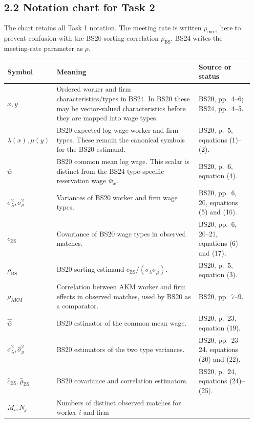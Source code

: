 \documentclass[11pt]{article}
\begin{document}
\subsection{2.2 Notation chart for Task 2}

The chart retains all Task 1 notation.  The meeting rate is written
\(\rho_{\mathrm{meet}}\) here to prevent confusion with the BS20 sorting
correlation \(\rho_{\mathrm{BS}}\).  BS24 writes the meeting-rate parameter as
\(\rho\).

\begin{longtable}{p{}p{}p{}}
\textbf{Symbol} & \textbf{Meaning} & \textbf{Source or status} \\
\hline
\(x,y\) & Ordered worker and firm characteristics/types in BS24.  In BS20
these may be vector-valued characteristics before they are mapped into wage
types. & BS20, pp.\ 4--6; BS24, pp.\ 4--5. \\
\(\lambda(x),\mu(y)\) & BS20 expected log-wage worker and firm types.  These
remain the canonical symbols for the BS20 estimand. & BS20, p.\ 5,
equations (1)--(2). \\
\(\bar w\) & BS20 common mean log wage.  This scalar is distinct from the
BS24 type-specific reservation wage \(\bar w_x\). & BS20, p.\ 6,
equation (4). \\
\(\sigma_\lambda^2,\sigma_\mu^2\) & Variances of BS20 worker and firm wage
types. & BS20, pp.\ 6, 20, equations (5) and (16). \\
\(c_{\mathrm{BS}}\) & Covariance of BS20 wage types in observed matches. &
BS20, pp.\ 6, 20--21, equations (6) and (17). \\
\(\rho_{\mathrm{BS}}\) & BS20 sorting estimand
\(c_{\mathrm{BS}}/(\sigma_\lambda\sigma_\mu)\). & BS20, p.\ 5,
equation (3). \\
\(\rho_{\mathrm{AKM}}\) & Correlation between AKM worker and firm effects in
observed matches, used by BS20 as a comparator. & BS20, pp.\ 7--9. \\
\(\widehat{\bar w}\) & BS20 estimator of the common mean wage. & BS20,
p.\ 23, equation (19). \\
\(\widehat\sigma_\lambda^2,\widehat\sigma_\mu^2\) & BS20 estimators of the
two type variances. & BS20, pp.\ 23--24, equations (20) and (22). \\
\(\widehat c_{\mathrm{BS}},\widehat\rho_{\mathrm{BS}}\) & BS20 covariance and
correlation estimators. & BS20, p.\ 24, equations (24)--(25). \\
\(M_i,N_j\) & Numbers of distinct observed matches for worker \(i\) and firm

\end{longtable}
\end{document}
